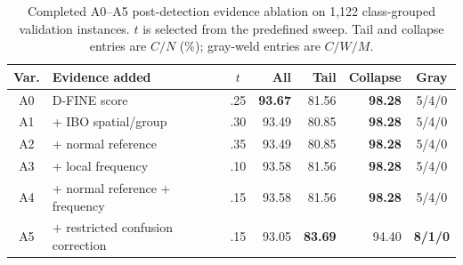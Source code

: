 \begin{table}[t]
\caption{Completed A0--A5 post-detection evidence ablation on 1,122 class-grouped validation instances. $t$ is selected from the predefined sweep. Tail and collapse entries are $C/N$ (\%); gray-weld entries are $C/W/M$.}
\label{tab:ibo-reliability}
\centering
\scriptsize
\setlength{\tabcolsep}{2.0pt}
\begin{tabular}{clcrrrc}
\toprule
Var. & Evidence added & $t$ & All & Tail & Collapse & Gray \\
\midrule
A0 & D-FINE score & .25 & \textbf{93.67} & 81.56 & \textbf{98.28} & 5/4/0 \\
A1 & + IBO spatial/group & .30 & 93.49 & 80.85 & \textbf{98.28} & 5/4/0 \\
A2 & + normal reference & .35 & 93.49 & 80.85 & \textbf{98.28} & 5/4/0 \\
A3 & + local frequency & .10 & 93.58 & 81.56 & \textbf{98.28} & 5/4/0 \\
A4 & + normal reference + frequency & .15 & 93.58 & 81.56 & \textbf{98.28} & 5/4/0 \\
A5 & + restricted confusion correction & .15 & 93.05 & \textbf{83.69} & 94.40 & \textbf{8/1/0} \\
\bottomrule
\end{tabular}
\end{table}
